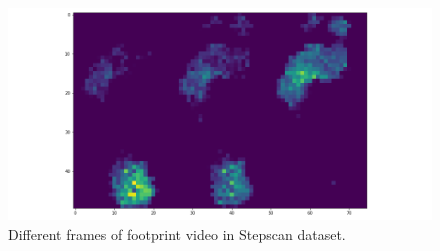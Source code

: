 
\begin{figure}
    \centering
    \begin{minipage}[b]{.5\textwidth}
        \includegraphics[width=\textwidth]{figures/project/frame1.png}
    \end{minipage}
    \caption{Different frames of footprint video in Stepscan dataset.}
    \label{fig:Stepscan_dataset}
\end{figure}


